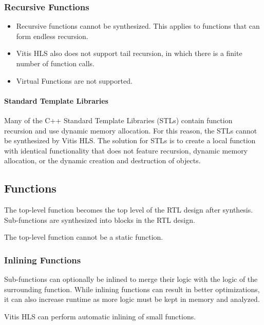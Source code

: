 \subsubsection{Recursive Functions}
\begin{itemize}
  \item Recursive functions cannot be synthesized. This applies to functions that can form endless recursion.
  \item Vitis HLS also does not support tail recursion, in which there is a finite number of function calls.
  \item Virtual Functions are not supported.
\end{itemize}

\paragraph{Standard Template Libraries}
Many of the C++ Standard Template Libraries (STLs) contain function recursion and use dynamic memory allocation. For this reason, the STLs cannot be synthesized by Vitis HLS. The solution for STLs is to create a local function with identical functionality that does not feature recursion, dynamic memory allocation, or the dynamic creation and destruction of objects.

\subsection{Functions}
The top-level function becomes the top level of the RTL design after synthesis. Sub-functions are synthesized into blocks in the RTL design.

\begin{highlight}
  The top-level function cannot be a static function.
\end{highlight}

\subsubsection{Inlining Functions}
Sub-functions can optionally be inlined to merge their logic with the logic of the surrounding function. While inlining functions can result in better optimizations, it can also increase runtime as more logic must be kept in memory and analyzed.

\begin{highlight}
  Vitis HLS can perform automatic inlining of small functions.
\end{highlight} 

